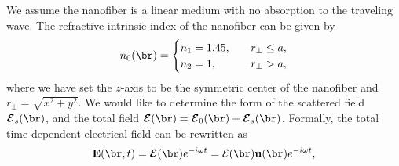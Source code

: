 \documentclass[]{report}
\begin{document}
We assume the nanofiber is a linear medium with no absorption to the traveling wave. The refractive intrinsic index of the nanofiber can be given by
\begin{align}
n_0(\br) = \begin{cases} 
n_1=1.45, &\quad r_\perp \leq a,\\
n_2=1, &\quad r_\perp >a,
\end{cases} 
\end{align}
where we have set the $ z $-axis to be the symmetric center of the nanofiber and $ r_\perp =\sqrt{x^2+y^2} $. We would like to determine the form of the scattered field $ \boldsymbol{\mathcal{E}}_s(\br) $, and the total field $ \boldsymbol{\mathcal{E}}(\br)=\boldsymbol{\mathcal{E}}_0(\br)+\boldsymbol{\mathcal{E}}_s(\br) $. Formally, the total time-dependent electrical field can be rewritten as 
\begin{equation}
\mathbf{E}(\br,t)=\boldsymbol{\mathcal{E}}(\br)e^{-i\omega t} %
=\mathcal{E}(\br)\mathbf{u}(\br)e^{-i\omega t}, %
\label{Ert}
\end{equation}
\end{document}
